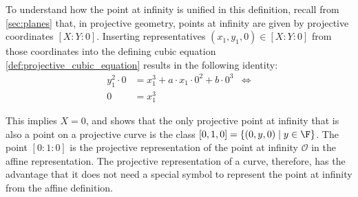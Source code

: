 To understand how the point at infinity is unified in this definition, recall from \secname{} \ref{sec:planes} that, in projective geometry, points at infinity are given by projective coordinates $[X:Y:0]$. Inserting representatives $(x_1,y_1,0)\in [X:Y:0]$ from those coordinates into the defining cubic equation \ref{def:projective_cubic_equation} results in the following identity:
\begin{align*}
y_1^2\cdot 0 & = x_1^3+a\cdot x_1\cdot 0^2 + b\cdot 0^3 & \Leftrightarrow \\
0 & = x_1^3
\end{align*} 

This implies $X=0$, and shows that the only projective point at infinity that is also a point on a projective  curve is the class $[0,1,0] = \{(0,y,0)\;|\; y\in \F\}$. The point $[0:1:0]$ is the projective representation of the point at infinity $\mathcal{O}$ in the affine representation. The projective representation of a  curve, therefore, has the advantage that it does not need a special symbol to represent the point at infinity from the affine definition.

